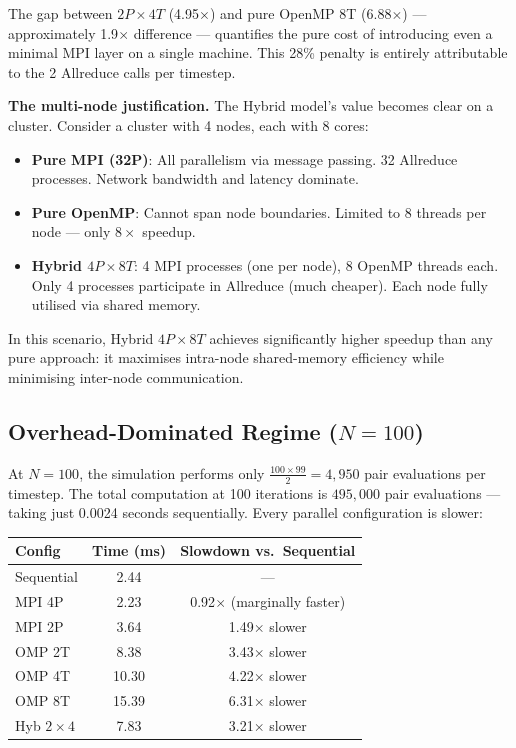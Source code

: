 ﻿\documentclass[12pt,a4paper]{article}
\begin{document}
The gap between $2P\times4T$ (4.95$\times$) and pure OpenMP 8T (6.88$\times$)
--- approximately 1.9$\times$ difference --- quantifies the pure cost of
introducing even a minimal MPI layer on a single machine. This 28\% penalty
is entirely attributable to the 2 Allreduce calls per timestep.

\textbf{The multi-node justification.}
The Hybrid model's value becomes clear on a cluster. Consider a cluster
with 4 nodes, each with 8 cores:
\begin{itemize}
    \item \textbf{Pure MPI (32P)}: All parallelism via message passing.
          32 Allreduce processes. Network bandwidth and latency dominate.
    \item \textbf{Pure OpenMP}: Cannot span node boundaries. Limited to
          8 threads per node --- only $8\times$ speedup.
    \item \textbf{Hybrid $4P\times8T$}: 4 MPI processes (one per node),
          8 OpenMP threads each. Only 4 processes participate in Allreduce
          (much cheaper). Each node fully utilised via shared memory.
\end{itemize}

In this scenario, Hybrid $4P\times8T$ achieves significantly higher speedup
than any pure approach: it maximises intra-node shared-memory efficiency
while minimising inter-node communication.

\subsection{Overhead-Dominated Regime \texorpdfstring{($N=100$)}{(N=100)}}

At $N=100$, the simulation performs only $\frac{100 \times 99}{2} = 4{,}950$
pair evaluations per timestep. The total computation at 100 iterations is
$495{,}000$ pair evaluations --- taking just 0.0024 seconds sequentially.
Every parallel configuration is slower:

\begin{center}
\begin{tabular}{lcc}
    \toprule
    \textbf{Config} & \textbf{Time (ms)} & \textbf{Slowdown vs.\ Sequential} \\
    \midrule
    Sequential  & 2.44  & --- \\
    MPI 4P      & 2.23  & 0.92$\times$ (marginally faster) \\
    MPI 2P      & 3.64  & 1.49$\times$ slower \\
    OMP 2T      & 8.38  & 3.43$\times$ slower \\
    OMP 4T      & 10.30 & 4.22$\times$ slower \\
    OMP 8T      & 15.39 & 6.31$\times$ slower \\
    Hyb $2\times4$ & 7.83 & 3.21$\times$ slower \\
    \bottomrule
\end{tabular}
\end{center}
\end{document}
